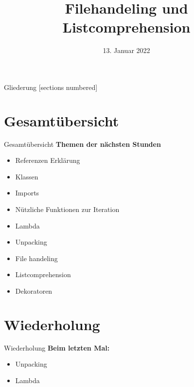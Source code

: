 



\title{Filehandeling und Listcomprehension}
\date{13. Januar 2022}


	
\maketitle

\begin{frame}{Gliederung}
	[sections numbered]
	\tableofcontents
\end{frame}

\section*{Gesamtübersicht}
\begin{frame}{Gesamtübersicht}
	\textbf{Themen der nächsten Stunden}
	\begin{itemize}
		\item Referenzen Erklärung
		\item  Klassen
		\item Imports
		\item Nützliche Funktionen zur Iteration
		\item Lambda
		\item Unpacking
		\item \alert{File handeling}
		\item \alert{Listcomprehension}
		\item Dekoratoren
	\end{itemize}
\end{frame}

\section{Wiederholung}
\begin{frame}{Wiederholung}
	\textbf{Beim letzten Mal:}
	\begin{itemize}
		\item Unpacking
		
		
		\item Lambda
		
	\end{itemize}	
\end{frame}

